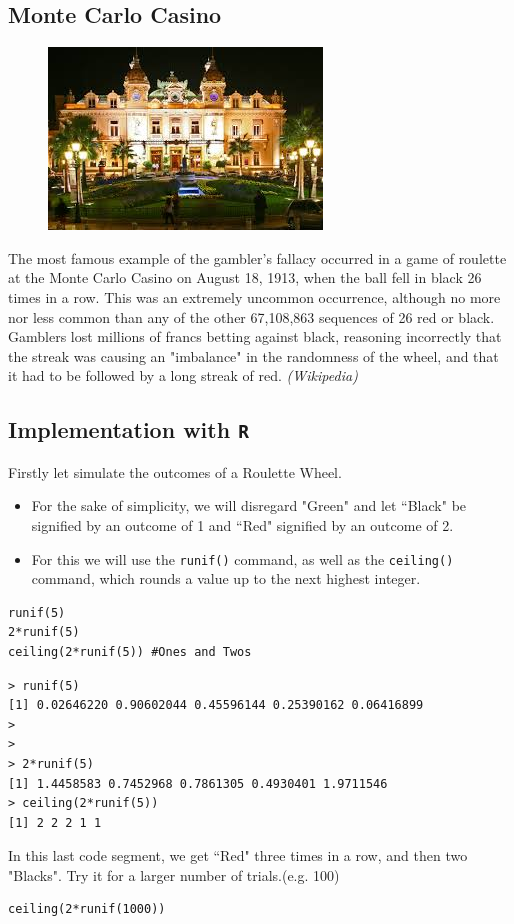 \documentclass[11pt]{article} %
\begin{document}
\subsection{Monte Carlo Casino}\begin{figure}
\centering
\includegraphics[width=0.7\linewidth]{./MonteCarlo}
\caption{}
\label{Monte Carlo}
\end{figure}

The most famous example of the gambler’s fallacy occurred in a game of roulette at the Monte Carlo Casino on August 18, 1913, when the ball fell in black 26 times in a row. This was an extremely uncommon occurrence, although no more nor less common than any of the other 67,108,863 sequences of 26 red or black. Gamblers lost millions of francs betting against black, reasoning incorrectly that the streak was causing an "imbalance" in the randomness of the wheel, and that it had to be followed by a long streak of red. \textit{(Wikipedia)}
\newpage
\subsection{Implementation with \texttt{R}}
Firstly let simulate the outcomes of a Roulette Wheel.
\begin{itemize}
\item  For the sake of simplicity, we will disregard "Green" and let ``Black" be signified by an outcome of 1 and ``Red" signified by an outcome of 2.
\item 
For this we will use the \texttt{runif()} command, as well as the \texttt{ceiling()} command, which rounds a value up to the next highest integer.
\end{itemize}
\begin{framed}
\begin{verbatim}
runif(5)
2*runif(5)
ceiling(2*runif(5)) #Ones and Twos
\end{verbatim}
\end{framed}
\begin{verbatim}
> runif(5)
[1] 0.02646220 0.90602044 0.45596144 0.25390162 0.06416899
> 
> 
> 2*runif(5)
[1] 1.4458583 0.7452968 0.7861305 0.4930401 1.9711546
> ceiling(2*runif(5))
[1] 2 2 2 1 1
\end{verbatim}
In this last code segment, we get ``Red" three times in a row, and  then two "Blacks". Try it for a larger number of trials.(e.g. 100)
\begin{framed}
\begin{verbatim}
ceiling(2*runif(1000))
\end{verbatim}
\end{framed}
\end{document}
